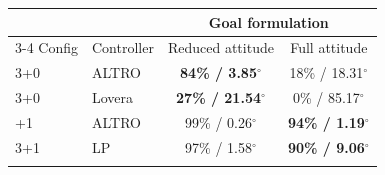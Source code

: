 \begin{tabular}{llcc}
\toprule
 & & \multicolumn{2}{c}{Goal formulation} \\
\cmidrule(lr){3-4}
Config & Controller & Reduced attitude & Full attitude \\
\midrule
3+0 & ALTRO & \textbf{84\% / 3.85$^\circ$} & {18\% / 18.31$^\circ$} \\
3+0 & Lovera & \textbf{27\% / 21.54$^\circ$} & {0\% / 85.17$^\circ$} \\
\addlinespace
3+1 & ALTRO & {99\% / 0.26$^\circ$} & \textbf{94\% / 1.19$^\circ$} \\
3+1 & LP & {97\% / 1.58$^\circ$} & \textbf{90\% / 9.06$^\circ$} \\
\addlinespace
\bottomrule
\end{tabular}
